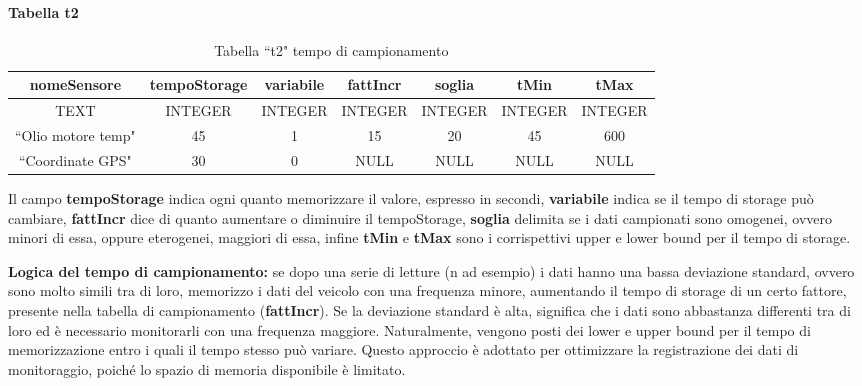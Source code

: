 \documentclass[12pt, a4paper, italian]{report}
\numberwithin{figure}{chapter}
\numberwithin{table}{chapter}
\begin{document}
\paragraph{Tabella t2}
\begin{table}[h!]
  \centering 
  \begin{adjustbox}{max width=\textwidth}
    \begin{tabular}{|c|c|c|c|c|c|c|}
      \hline
      \textbf{nomeSensore} & \textbf{tempoStorage} & \textbf{variabile} & \textbf{fattIncr} & \textbf{soglia} & \textbf{tMin} & \textbf{tMax} \\
      \hline
      TEXT & INTEGER & INTEGER & INTEGER & INTEGER & INTEGER & INTEGER \\
      \hline
      ``Olio motore temp" & 45 & 1 & 15 & 20 & 45 & 600 \\
      \hline
      ``Coordinate GPS" & 30 & 0 & NULL & NULL & NULL & NULL \\
      \hline
    \end{tabular}
  \end{adjustbox}
  \caption{Tabella ``t2" tempo di campionamento}
  \label{tab:t2 campionamento}
\end{table}
Il campo \textbf{tempoStorage} indica ogni quanto memorizzare il valore, espresso in secondi, \textbf{variabile} indica se il tempo di storage può cambiare, \textbf{fattIncr} dice di quanto aumentare o diminuire il tempoStorage, \textbf{soglia} delimita se i dati campionati sono omogenei, ovvero minori di essa, oppure eterogenei, maggiori di essa, infine \textbf{tMin} e \textbf{tMax} sono i corrispettivi upper e lower bound per il tempo di storage.

\textbf{Logica del tempo di campionamento:} se dopo una serie di letture (n ad esempio) i dati hanno una bassa deviazione standard, ovvero sono molto simili tra di loro, memorizzo i dati del veicolo con una frequenza minore, aumentando il tempo di storage di un certo fattore, presente nella tabella di campionamento (\textbf{fattIncr}). Se la deviazione standard è alta, significa che i dati sono abbastanza differenti tra di loro ed è necessario monitorarli con una frequenza maggiore. Naturalmente, vengono posti dei lower e upper bound per il tempo di memorizzazione entro i quali il tempo stesso può variare. Questo approccio è adottato per ottimizzare la registrazione dei dati di monitoraggio, poiché lo spazio di memoria disponibile è limitato.
\end{document}

